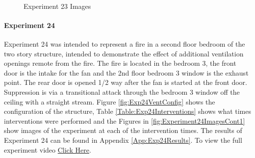 \documentclass{article}
\begin{document}
\begin{figure}[H]
	\ContinuedFloat 
	\centering 
	 \ 
	\caption{Experiment 23 Images}
	\label{fig:Experiment23ImagesCont3} 
\end{figure}

\paragraph{Experiment 24}\mbox{}

Experiment 24 was intended to represent a fire in a second floor bedroom of the two story structure, intended to demonstrate the effect of additional ventilation openings remote from the fire. The fire is located in the bedroom 3, the front door is the intake for the fan and the 2nd floor bedroom 3 window is the exhaust point. The rear door is opened 1/2 way after the fan is started at the front door. Suppression is via a transitional attack through the bedroom 3 window off the ceiling with a straight stream. Figure \ref{fig:Exp24VentConfig} shows the configuration of the structure, Table \ref{Table:Exp24Interventions} shows what times interventions were performed and the Figures in \ref{fig:Experiment24ImagesCont1} show images of the experiment at each of the intervention times. The results of Experiment 24 can be found in Appendix \ref{App:Exp24Results}. To view the full experiment video \href{https://youtu.be/T430FepUd4E}{Click Here}.
\end{document}
